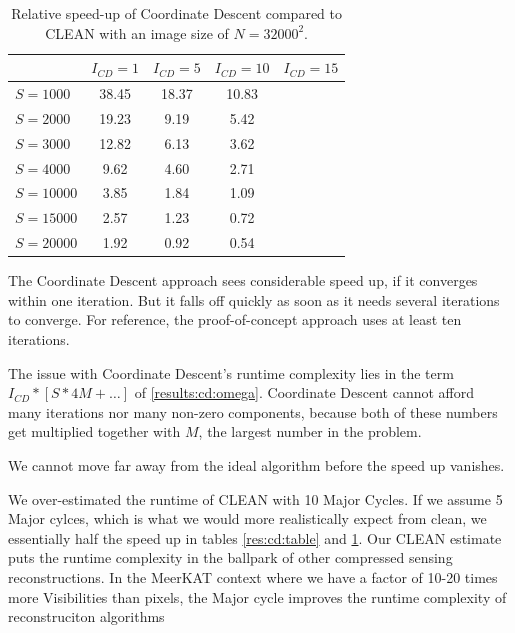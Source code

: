 \begin{table}[h!]
	\begin{center}
		\begin{tabular}{l|c|c|c|c} %
			& $I_{CD} = 1$ & $I_{CD} = 5$ &  $I_{CD} = 10$ &  $I_{CD} = 15$\\
			\hline
			$S=1000$ & 38.45 & 18.37 & 10.83 & \\
			$S=2000$ & 19.23 & 9.19 & 5.42 &  \\
			$S=3000$ & 12.82 & 6.13 & 3.62 &  \\
			$S=4000$ & 9.62 & 4.60 & 2.71 & \\
			\hline
			$S=10000$ & 3.85 & 1.84 & 1.09 &  \\
			$S=15000$ & 2.57 & 1.23 & 0.72 & \\
			$S=20000$ & 1.92 & 0.92 & 0.54 & \\
		\end{tabular}
		\caption{Relative speed-up of Coordinate Descent compared to CLEAN with an image size of $N=32000^2$. }
		\label{res:cd:large:table}
	\end{center}
\end{table}

The Coordinate Descent approach sees considerable speed up, if it converges within one iteration. But it falls off quickly as soon as it needs several iterations to converge. For reference, the proof-of-concept approach uses at least ten iterations. 

The issue with Coordinate Descent's runtime complexity lies in the term $I_{CD} * [S * 4M +\ldots]$ of \eqref{results:cd:omega}. Coordinate Descent cannot afford many iterations nor many non-zero components, because both of these numbers get multiplied together with $M$, the largest number in the problem.

We cannot move far away from the ideal algorithm before the speed up vanishes. 

We over-estimated the runtime of CLEAN with 10 Major Cycles. If we assume 5 Major cylces, which is what we would more realistically expect from clean, we essentially half the speed up in tables \ref{res:cd:table} and \ref{res:cd:large:table}. Our CLEAN estimate puts the runtime complexity in the ballpark of other compressed sensing reconstructions.
In the MeerKAT context where we have a factor of 10-20 times more Visibilities than pixels, the Major cycle improves the runtime complexity of reconstruciton algorithms

